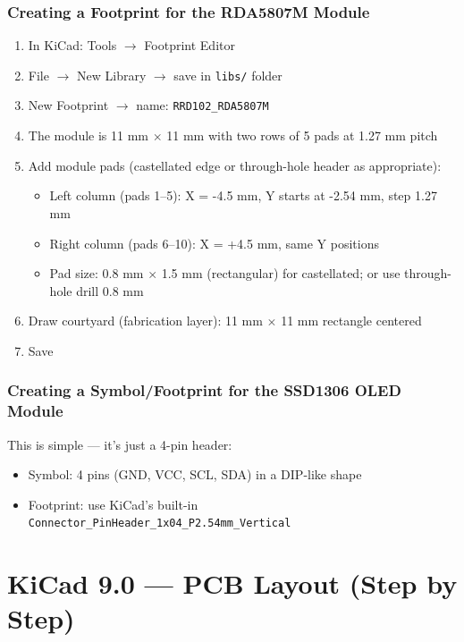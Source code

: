 \documentclass[a4paper,11pt]{article}
\renewcommand*{\,}{ }%
\begin{document}
\subsubsection{Creating a Footprint for the RDA5807M Module}

\begin{enumerate}
    \item In KiCad: Tools $\rightarrow$ Footprint Editor
    \item File $\rightarrow$ New Library $\rightarrow$ save in \texttt{libs/} folder
    \item New Footprint $\rightarrow$ name: \texttt{RRD102\_RDA5807M}
    \item The module is 11\,mm $\times$ 11\,mm with two rows of 5 pads at 1.27\,mm pitch
    \item Add module pads (castellated edge or through-hole header as appropriate):
    \begin{itemize}[noitemsep]
        \item Left column (pads 1--5): X = -4.5\,mm, Y starts at -2.54\,mm, step 1.27\,mm
        \item Right column (pads 6--10): X = +4.5\,mm, same Y positions
        \item Pad size: 0.8\,mm $\times$ 1.5\,mm (rectangular) for castellated; or use through-hole drill 0.8\,mm
    \end{itemize}
    \item Draw courtyard (fabrication layer): 11\,mm $\times$ 11\,mm rectangle centered
    \item Save
\end{enumerate}

\subsubsection{Creating a Symbol/Footprint for the SSD1306 OLED Module}

This is simple --- it's just a 4-pin header:
\begin{itemize}[noitemsep]
    \item Symbol: 4 pins (GND, VCC, SCL, SDA) in a DIP-like shape
    \item Footprint: use KiCad's built-in \texttt{Connector\_PinHeader\_1x04\_P2.54mm\_Vertical}
\end{itemize}

\section{KiCad 9.0 --- PCB Layout (Step by Step)}
\label{sec:pcb}
\end{document}
